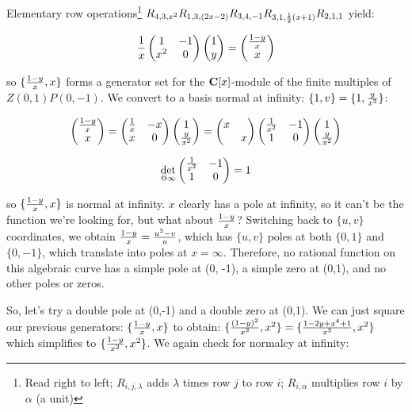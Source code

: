 Elementary row operations\footnote{Read right to left; $R_{i,j,\lambda}$ adds $\lambda$ times row $j$ to row $i$; $R_{i,\alpha}$ multiplies row $i$ by $\alpha$ (a unit)} $R_{4,3,x^2} R_{1,3,(2x-2)} R_{3,4,-1} R_{3,1,{1\over2}(x+1)} R_{2,1,1} $ yield:

$${1\over x}\begin{pmatrix}1 & -1 \cr x^2 & 0\end{pmatrix} \begin{pmatrix}1 \cr y\end{pmatrix} = \begin{pmatrix}{{1-y}\over{x}} \cr x\end{pmatrix} $$

so $\{ {{1-y}\over{x}}, x \} $ forms a generator set for
the ${\bf C}[x]$-module of the finite multiples of $Z(0,1)P(0,-1)$.
We convert to a basis normal at infinity: $\{1, v\} = \{1, {y\over x^2}\}$:

$$\begin{pmatrix}{{1-y}\over{x}} \cr x\end{pmatrix} = \begin{pmatrix}{1\over x} & -x \cr x & 0\end{pmatrix} \begin{pmatrix}1 \cr {y\over x^2}\end{pmatrix}
= \begin{pmatrix}x & \cr & x\end{pmatrix} \begin{pmatrix}{1\over x^2} & -1 \cr 1 & 0\end{pmatrix} \begin{pmatrix}1 \cr {y\over x^2}\end{pmatrix}$$

$$\det_{@ \infty} \begin{pmatrix}{1\over x^2} & -1 \cr 1 & 0\end{pmatrix} = 1$$

so $\{ {{1-y}\over{x}}, x \} $ is normal at infinity.  $x$ clearly has
a pole at infinity, so it can't be the function we're looking for, but
what about ${{1-y}\over{x}}$?  Switching back to $\{u,v\}$
coordinates, we obtain ${{1-y}\over{x}} = {{u^2-v}\over u}$, which has
$\{u,v\}$ poles at both $\{0,1\}$ and $\{0,-1\}$, which translate into
poles at $x=\infty$.  Therefore, no rational function on this
algebraic curve has a simple pole at (0, -1), a simple zero at (0,1),
and no other poles or zeros.

\vfill\eject

So, let's try a double pole at (0,-1) and a double zero at (0,1).  We
can just square our previous generators:
$\{ {{1-y}\over{x}}, x \} $
to obtain: 
$\{ {(1-y)^2\over{x^2}}, x^2 \} = \{ {{1-2y+x^4+1}\over{x^2}}, x^2 \}$
which simplifies to
$\{ {{1-y}\over{x^2}}, x^2 \}$.  We again check for normalcy
at infinity:

